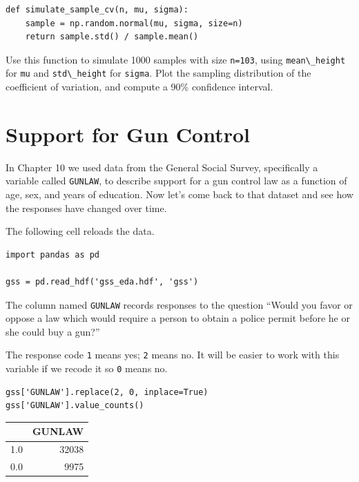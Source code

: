 \begin{lstlisting}[]
def simulate_sample_cv(n, mu, sigma):
    sample = np.random.normal(mu, sigma, size=n)
    return sample.std() / sample.mean()
\end{lstlisting}

Use this function to simulate 1000 samples with size
\passthrough{\lstinline!n=103!}, using
\passthrough{\lstinline!mean\_height!} for \passthrough{\lstinline!mu!}
and \passthrough{\lstinline!std\_height!} for
\passthrough{\lstinline!sigma!}. Plot the sampling distribution of the
coefficient of variation, and compute a 90\% confidence interval.

\hypertarget{support-for-gun-control}{%
\section{Support for Gun Control}\label{support-for-gun-control}}

In Chapter 10 we used data from the General Social Survey, specifically
a variable called \passthrough{\lstinline!GUNLAW!}, to describe support
for a gun control law as a function of age, sex, and years of education.
Now let's come back to that dataset and see how the responses have
changed over time.

The following cell reloads the data.

\begin{lstlisting}[]
import pandas as pd

gss = pd.read_hdf('gss_eda.hdf', 'gss')
\end{lstlisting}

The column named \passthrough{\lstinline!GUNLAW!} records responses to
the question ``Would you favor or oppose a law which would require a
person to obtain a police permit before he or she could buy a gun?''

The response code \passthrough{\lstinline!1!} means yes;
\passthrough{\lstinline!2!} means no. It will be easier to work with
this variable if we recode it so \passthrough{\lstinline!0!} means no.

\begin{lstlisting}[]
gss['GUNLAW'].replace(2, 0, inplace=True)
gss['GUNLAW'].value_counts()
\end{lstlisting}

\begin{tabular}{lr}
\midrule
{} &  GUNLAW \\
\midrule
1.0 &   32038 \\
0.0 &    9975 \\
\midrule
\end{tabular}

